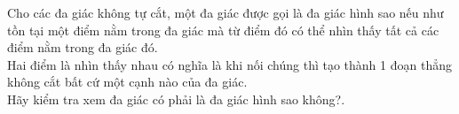 Cho các đa giác không tự cắt, một đa giác được gọi là đa giác hình sao nếu như tồn tại một điểm nằm trong đa giác mà từ điểm đó có thể nhìn thấy tất cả các điểm nằm trong đa giác đó.   
\\   Hai điểm là nhìn thấy nhau có nghĩa là khi nối chúng thì tạo thành 1 đoạn thẳng không cắt bất cứ một cạnh nào của đa giác.   
\\   Hãy kiểm tra xem đa giác có phải là đa giác hình sao không?.